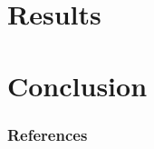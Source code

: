 \documentclass[9pt]{beamer}
\begin{document}
\section{Results}

\section{Conclusion}


\begin{frame}[allowframebreaks]
  \frametitle{References}
  
  {\footnotesize  }

\end{frame}



\end{document}

